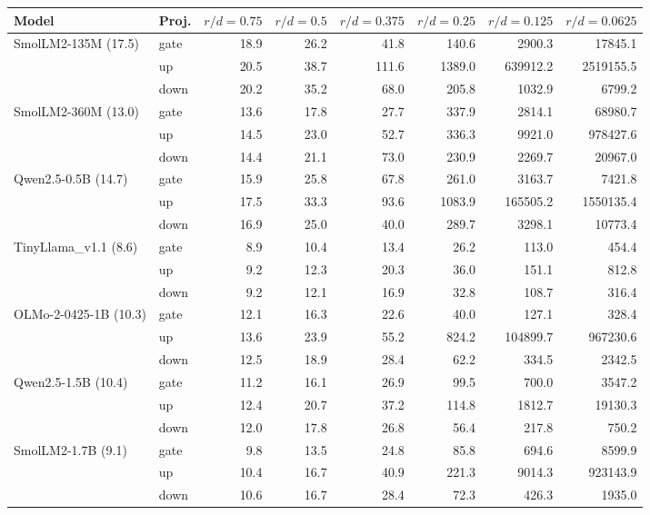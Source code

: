 \begin{tabular}{llrrrrrr}
\toprule
Model & Proj. & $r/d=0.75$ & $r/d=0.5$ & $r/d=0.375$ & $r/d=0.25$ & $r/d=0.125$ & $r/d=0.0625$ \\
\midrule
SmolLM2-135M (17.5) & gate & 18.9 & 26.2 & 41.8 & 140.6 & 2900.3 & 17845.1 \\
 & up & 20.5 & 38.7 & 111.6 & 1389.0 & 639912.2 & 2519155.5 \\
 & down & 20.2 & 35.2 & 68.0 & 205.8 & 1032.9 & 6799.2 \\
\midrule
SmolLM2-360M (13.0) & gate & 13.6 & 17.8 & 27.7 & 337.9 & 2814.1 & 68980.7 \\
 & up & 14.5 & 23.0 & 52.7 & 336.3 & 9921.0 & 978427.6 \\
 & down & 14.4 & 21.1 & 73.0 & 230.9 & 2269.7 & 20967.0 \\
\midrule
Qwen2.5-0.5B (14.7) & gate & 15.9 & 25.8 & 67.8 & 261.0 & 3163.7 & 7421.8 \\
 & up & 17.5 & 33.3 & 93.6 & 1083.9 & 165505.2 & 1550135.4 \\
 & down & 16.9 & 25.0 & 40.0 & 289.7 & 3298.1 & 10773.4 \\
\midrule
TinyLlama\_v1.1 (8.6) & gate & 8.9 & 10.4 & 13.4 & 26.2 & 113.0 & 454.4 \\
 & up & 9.2 & 12.3 & 20.3 & 36.0 & 151.1 & 812.8 \\
 & down & 9.2 & 12.1 & 16.9 & 32.8 & 108.7 & 316.4 \\
\midrule
OLMo-2-0425-1B (10.3) & gate & 12.1 & 16.3 & 22.6 & 40.0 & 127.1 & 328.4 \\
 & up & 13.6 & 23.9 & 55.2 & 824.2 & 104899.7 & 967230.6 \\
 & down & 12.5 & 18.9 & 28.4 & 62.2 & 334.5 & 2342.5 \\
\midrule
Qwen2.5-1.5B (10.4) & gate & 11.2 & 16.1 & 26.9 & 99.5 & 700.0 & 3547.2 \\
 & up & 12.4 & 20.7 & 37.2 & 114.8 & 1812.7 & 19130.3 \\
 & down & 12.0 & 17.8 & 26.8 & 56.4 & 217.8 & 750.2 \\
\midrule
SmolLM2-1.7B (9.1) & gate & 9.8 & 13.5 & 24.8 & 85.8 & 694.6 & 8599.9 \\
 & up & 10.4 & 16.7 & 40.9 & 221.3 & 9014.3 & 923143.9 \\
 & down & 10.6 & 16.7 & 28.4 & 72.3 & 426.3 & 1935.0 \\
\bottomrule
\end{tabular}
